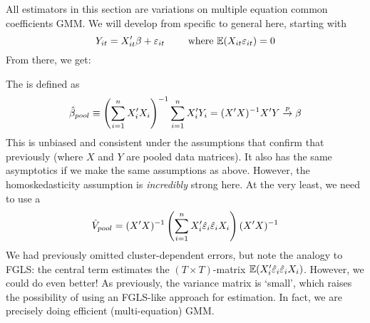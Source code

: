 \documentclass[10pt]{article}
\begin{document}
\begin{remark}
	All estimators in this section are variations on multiple equation common coefficients GMM. We will develop from specific to general here, starting with \[Y_{it} = X_{it}'\beta + \varepsilon_{it} \qquad \text{ where } \mathbb{E}(X_{it}\varepsilon_{it}) = 0\]From there, we get:
\end{remark}
\begin{definition}
	The  is defined as \[\hat{\beta}_{pool} \equiv \left( \sum_{i=1}^n X_i'X_i\right)^{-1} \sum_{i=1}^n X_i'Y_i = (X'X)^{-1}X'Y \overset{p}{\to} \beta\]This is unbiased and consistent under the assumptions that confirm that previously (where $X$ and $Y$ are pooled data matrices). It also has the same asymptotics if we make the same assumptions as above. However, the homoskedasticity assumption is \emph{incredibly} strong here. At the very least, we need to use a \[\hat{V}_{pool} = (X'X)^{-1} \left( \sum_{i=1}^n X_i' \hat{\varepsilon}_i\hat{\varepsilon}_i X_i\right) (X'X)^{-1}\]We had previously omitted cluster-dependent errors, but note the analogy to FGLS: the central term estimates the $(T \times T)$-matrix $\mathbb{E}(X_i'\hat{\varepsilon}_i\hat{\varepsilon}_i X_i)$. However, we could do even better! As previously, the variance matrix is `small', which raises the possibility of using an FGLS-like approach for estimation. In fact, we are precisely doing efficient (multi-equation) GMM. 
\end{definition}
\end{document}
